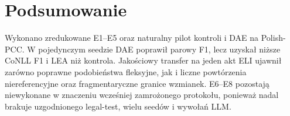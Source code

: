 \section{Podsumowanie}

Wykonano zredukowane E1--E5 oraz naturalny pilot kontroli i DAE na Polish-PCC. W pojedynczym seedzie DAE poprawił parowy F1, lecz uzyskał niższe CoNLL F1 i LEA niż kontrola. Jakościowy transfer na jeden akt ELI ujawnił zarówno poprawne podobieństwa fleksyjne, jak i liczne powtórzenia niereferencyjne oraz fragmentaryczne granice wzmianek. E6--E8 pozostają niewykonane w znaczeniu wcześniej zamrożonego protokołu, ponieważ nadal brakuje uzgodnionego legal-test, wielu seedów i wywołań LLM.
